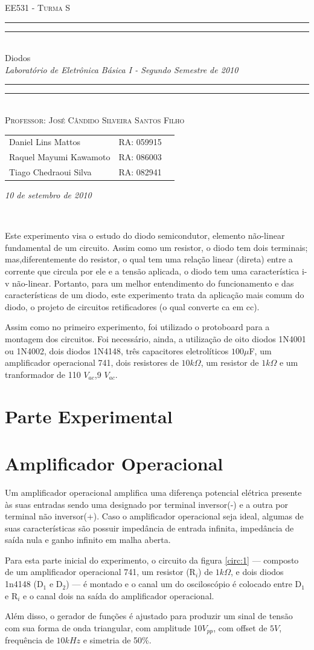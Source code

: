 \documentclass[a4paper]{article} %
\date{Setembro 10, 2010}
\newcommand*{\titleTMB}{\begingroup \centering \settowidth{\unitlength}{\LARGE EE531} {\large\scshape EE531 - Turma S}\\[0.2\baselineskip] \rule{11.0cm}{1.6pt}\vspace*{-\baselineskip}\vspace*{2pt} \rule{11.0cm}{0.4pt}\\[\baselineskip] {\LARGE  Diodos}\\\vspace*{\baselineskip}  {\itshape Laboratório de Eletrônica Básica I - Segundo Semestre de 2010}\\ \rule{11.0cm}{0.4pt}\vspace*{-\baselineskip}\vspace{3.2pt} \rule{11.0cm}{1.6pt}\\[\baselineskip] {\large\scshape Professor: José Cândido Silveira Santos Filho}\par \vfill {\normalsize   \scshape 
    \begin{center} 
      \begin{tabular}{  l  l  p{5cm} } 
 	Daniel Lins Mattos & RA: 059915\\
        Raquel Mayumi Kawamoto & RA: 086003\\
        Tiago Chedraoui Silva  & RA: 082941\\
      \end{tabular} \end{center}
    \itshape 10 de setembro de 2010    }\\[\baselineskip] \vspace{3.2pt} \endgroup}
\begin{document}
\titleTMB 
\newpage


Este experimento visa o estudo do diodo semicondutor, elemento não-linear
fundamental de um circuito. Assim como um resistor, o diodo tem dois terminais; mas,diferentemente do resistor, o qual tem uma relação linear (direta) entre a corrente que circula por ele e a tensão aplicada, o diodo tem uma característica i-v não-linear.
      Portanto, para um melhor entendimento do funcionamento e das características de um diodo, este experimento trata da aplicação mais comum do diodo, o projeto de circuitos retificadores (o qual converte ca em cc).

        Assim como no primeiro experimento, foi utilizado o protoboard para a montagem dos
circuitos. Foi necessário, ainda, a utilização de oito diodos 1N4001 ou 1N4002, dois diodos
1N4148, três capacitores eletrolíticos $100\mu$F,  um amplificador operacional 741, dois resistores
de $10k\Omega$, um resistor de $1k\Omega$ e um tranformador de 110 $V_{ac}$,9 $V_{ac}$.


\section*{Parte Experimental}
\section{Amplificador Operacional}
 \setcounter{figure}{0}

Um amplificador operacional amplifica uma diferença potencial elétrica presente às suas entradas sendo uma designado por terminal inversor(-) e a outra por terminal não inversor(+).
Caso o amplificador operacional seja ideal, algumas de suas características são possuir impedância de entrada infinita, impedância de saída nula e ganho infinito em malha aberta.

 Para esta parte inicial do experimento, o circuito da figura \ref{circ:1} --- composto de um amplificador operacional 741, um resistor (R$_i$) de $1k\Omega$, e dois diodos 1n4148 (D$_1$ e D$_2$) --- é montado e o canal um do osciloscópio é colocado entre D$_1$ e R$_i$ e o canal dois na saída do amplificador operacional. 

Além disso, o gerador de funções é ajustado para produzir um sinal de tensão com sua forma de onda triangular, com amplitude 10$V_{pp}$, com offset de $5V$, frequência de $10kHz$ e simetria de 50\%. 
\end{document}
